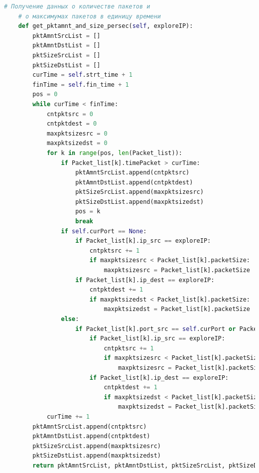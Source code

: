 \documentclass[spec, och, diploma]{SCWorks}
\begin{document}
\begin{lstlisting}[language=Python]
    # Получение данных о количестве пакетов и
    # о максимумах пакетов в единицу времени
    def get_pktamnt_and_size_persec(self, exploreIP):
        pktAmntSrcList = []
        pktAmntDstList = []
        pktSizeSrcList = []
        pktSizeDstList = []
        curTime = self.strt_time + 1
        finTime = self.fin_time + 1
        pos = 0
        while curTime < finTime:
            cntpktsrc = 0
            cntpktdest = 0
            maxpktsizesrc = 0
            maxpktsizedst = 0
            for k in range(pos, len(Packet_list)):
                if Packet_list[k].timePacket > curTime:
                    pktAmntSrcList.append(cntpktsrc)
                    pktAmntDstList.append(cntpktdest)
                    pktSizeSrcList.append(maxpktsizesrc)
                    pktSizeDstList.append(maxpktsizedst)
                    pos = k
                    break
                if self.curPort == None:
                    if Packet_list[k].ip_src == exploreIP:
                        cntpktsrc += 1
                        if maxpktsizesrc < Packet_list[k].packetSize:
                            maxpktsizesrc = Packet_list[k].packetSize
                    if Packet_list[k].ip_dest == exploreIP:
                        cntpktdest += 1
                        if maxpktsizedst < Packet_list[k].packetSize:
                            maxpktsizedst = Packet_list[k].packetSize
                else:
                    if Packet_list[k].port_src == self.curPort or Packet_list[k].port_dest == self.curPort:
                        if Packet_list[k].ip_src == exploreIP:
                            cntpktsrc += 1
                            if maxpktsizesrc < Packet_list[k].packetSize:
                                maxpktsizesrc = Packet_list[k].packetSize
                        if Packet_list[k].ip_dest == exploreIP:
                            cntpktdest += 1
                            if maxpktsizedst < Packet_list[k].packetSize:
                                maxpktsizedst = Packet_list[k].packetSize
            curTime += 1
        pktAmntSrcList.append(cntpktsrc)
        pktAmntDstList.append(cntpktdest)
        pktSizeSrcList.append(maxpktsizesrc)
        pktSizeDstList.append(maxpktsizedst)
        return pktAmntSrcList, pktAmntDstList, pktSizeSrcList, pktSizeDstList


\end{lstlisting}
\end{document}
